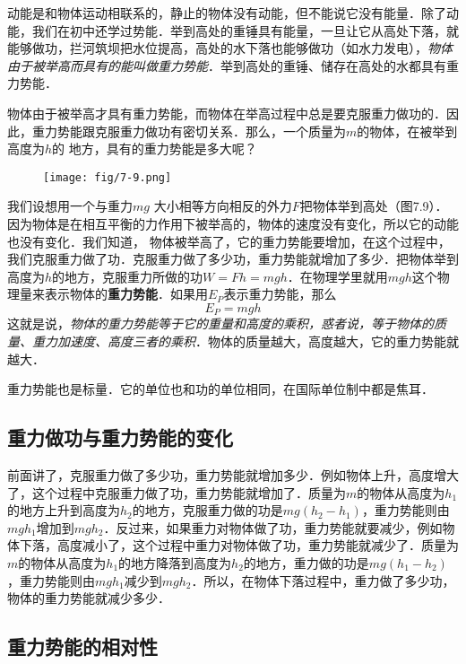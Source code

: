    动能是和物体运动相联系的，静止的物体没有动能，但不能说它没有能量．除了动能，我们在初中还学过势能．举到高处的重锤具有能量，一旦让它从高处下落，就能够做功，拦河筑坝把水位提高，高处的水下落也能够做功（如水力发电），\textit{物体由于被举高而具有的能叫做重力势能}．举到高处的重锤、储存在高处的水都具有重力势能．

    物体由于被举高才具有重力势能，而物体在举高过程中总是要克服重力做功的．因此，重力势能跟克服重力做功有密切关系．那么，一个质量为$m$的物体，在被举到高度为$h$的
    地方，具有的重力势能是多大呢？

\begin{figure}[htp]
\centering\texttt{[image: fig/7-9.png]}
\caption{}
\end{figure}

    我们设想用一个与重力$mg$
    大小相等方向相反的外力$F$把物体举到高处（图7.9）．因为物体是在相互平衡的力作用下被举高的，物体的速度没有变化，所以它的动能也没有变化．我们知道，
物体被举高了，它的重力势能要增加，在这个过程中，我们克服重力做了功．克服重力做了多少功，重力势能就增加了多少．把物体举到高度为$h$的地方，克服重力所做的功$W=Fh=mgh$．在物理学里就用$mgh$这个物理量来表示物体的\textbf{重力势能}．如果用$E_P$表示重力势能，那么
\[E_P =mgh\]
这就是说，\textit{物体的重力势能等于它的重量和高度的乘积，惑者说，等于物体的质量、重力加速度、高度三者的乘积}．物体的质量越大，高度越大，它的重力势能就越大．

重力势能也是标量．它的单位也和功的单位相同，在国际单位制中都是焦耳．

\subsection{重力做功与重力势能的变化}

前面讲了，克服重力做了多少功，重力势能就增加多少．例如物体上升，高度增大了，这个过程中克服重力做了功，重力势能就增加了．质量为$m$的物体从高度为$h_1$的地方上升到高度为$h_2$的地方，克服重力做的功是$mg(h_2-h_1)$，重力势能则由$mgh_1$增加到$mgh_2$．反过来，如果重力对物体做了功，重力势能就要减少，例如物体下落，高度减小了，这个过程中重力对物体做了功，重力势能就减少了．质量为$m$的物体从高度为$h_1$的地方降落到高度为$h_2$的地方，重力做的功是$mg(h_1-h_2)$，重力势能则由$mgh_1$减少到$mgh_2$．所以，在物体下落过程中，重力做了多少功，物体的重力势能就减少多少．

\subsection{重力势能的相对性}

